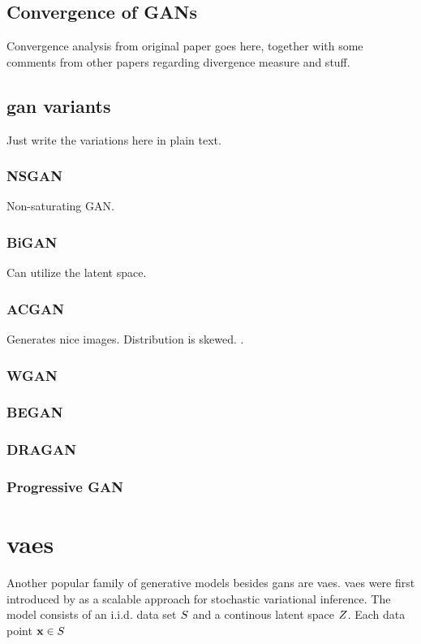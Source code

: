 \subsection{Convergence of GANs}
Convergence analysis from original paper goes here, together with some comments from other papers regarding divergence measure and stuff.

\subsection{\acrshort{gan} variants}
Just write the variations here in plain text.
\subsubsection{NSGAN} Non-saturating GAN.
\subsubsection{BiGAN}
Can utilize the latent space.
\subsubsection{ACGAN}
Generates nice images. \textcite{odena2016conditional} Distribution is skewed. \textcite{shuac2017acganisbad}.
\subsubsection{WGAN}
\subsubsection{BEGAN}
\subsubsection{DRAGAN}
\subsubsection{Progressive GAN}

\section{\acrlong{vaes}}
Another popular family of generative models besides \acrshort{gans} are \acrfull{vaes}. \acrlong{vaes} were first introduced by \textcite{kingma2013auto} as a scalable approach for stochastic variational inference. The model consists of an i.i.d. data set $S$ and a continous latent space $Z$. Each data point $\mathbf{x} \in S$ 

